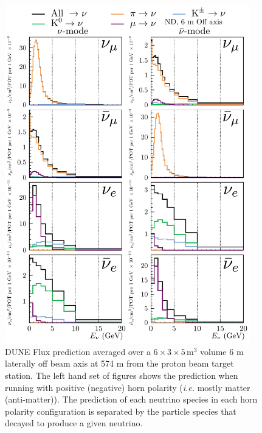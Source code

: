 \documentclass{article}
\begin{document}
\begin{figure}
  \centering
  \includegraphics[width=0.95\textwidth]{plots/fluxpredcompvar/ND_HadronParentFluxComponents_6m_offaxis}
  \caption{DUNE Flux prediction averaged over a $6\times 3\times 5\,\textrm{m}^{3}$ volume 6 m laterally off beam axis at 574 m from the proton beam target station. The left hand set of figures shows the prediction when running with positive (negative) horn polarity (\textit{i.e.} mostly matter (anti-matter)). The prediction of each neutrino species in each horn polarity configuration is separated by the particle species that decayed to produce a given neutrino.}
\end{figure}
\end{document}
